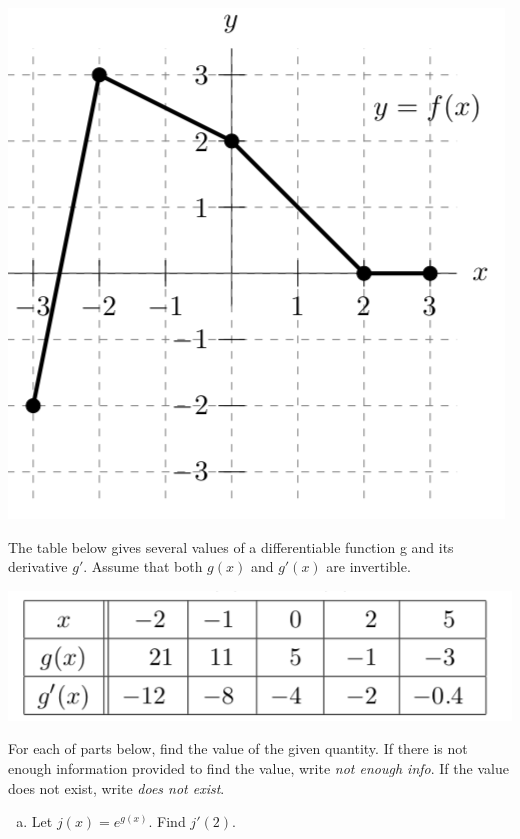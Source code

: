 \documentclass[11pt]{exam}
\begin{document}
\begin{questions}
\begin{multicols}{2}
  \begin{center}
    \includegraphics[scale=0.4]{graph4.png}
  \end{center}
	\noindent
	The table below gives several values of a differentiable function g and its derivative $g'$.
Assume that both $g(x)$ and $g'(x)$ are invertible.
\begin{center}
  \includegraphics[scale=0.4]{table4.png}
\end{center}
	\noindent
	For each of parts below, find the value of the given quantity. If there is not enough information provided to find the value, write \emph{not enough info}. If the value does not exist, write \emph{does not exist}.
	\end{multicols}
	\begin{multicols}{2}
	\begin{enumerate}[(a)]
	\item Let $j(x)=e^{g(x)}$. Find $j'(2)$.

\end{enumerate}
\end{multicols}
\end{questions}
\end{document}

